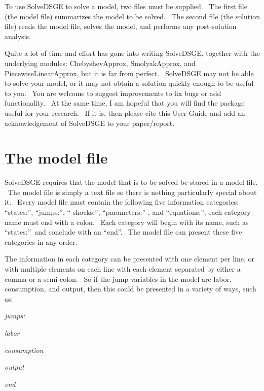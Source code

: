 \documentclass[notitlepage,11pt]{article}
\begin{document}
To use SolveDSGE to solve a model, two files must be supplied. \ The first
file (the model file) summarizes the model to be solved. \ The second file
(the solution file) reads the model file, solves the model, and performs any
post-solution analysis.

Quite a lot of time and effort has gone into writing SolveDSGE, together
with the underlying modules: ChebyshevApprox, SmolyakApprox, and
PiecewiseLinearApprox, but it is far from perfect. \ SolveDSGE may not be
able to solve your model, or it may not obtain a solution quickly enough to
be useful to you. \ You are welcome to suggest improvements to fix bugs or
add functionality. \ At the same time, I am hopeful that you will find the
package useful for your research. \ If it is, then please cite this User
Guide and add an acknowledgement of SolveDSGE to your paper/report.

\section{The model file}

SolveDSGE requires that the model that is to be solved be stored in a model
file. \ The model file is simply a text file so there is nothing
particularly special about it. \ Every model file must contain the following
five information categories: \textquotedblleft states:\textquotedblright ,
\textquotedblleft jumps:\textquotedblright , \textquotedblleft
shocks:\textquotedblright , \textquotedblleft parameters:\textquotedblright
, and \textquotedblleft equations:\textquotedblright ; each category name
must end with a colon. \ Each category will begin with its name, such as
\textquotedblleft states:\textquotedblright\ and conclude with an
\textquotedblleft end\textquotedblright . \ The model file can present these
five categories in any order.

The information in each category can be presented with one element per line,
or with multiple elements on each line with each element separated by either
a comma or a semi-colon. \ So if the jump variables in the model are labor,
consumption, and output, then this could be presented in a variety of ways,
such as:

\bigskip

\textit{jumps:}

\textit{labor}

\textit{consumption}

\textit{output}

\textit{end}
\end{document}
